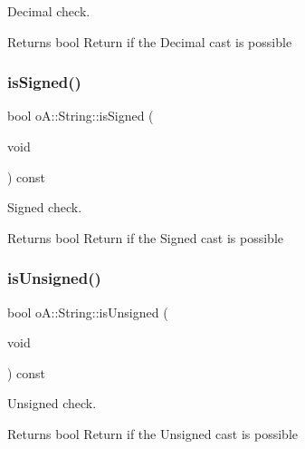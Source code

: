 Decimal check. 

\begin{DoxyReturn}{Returns}
bool Return if the Decimal cast is possible 
\end{DoxyReturn}
\mbox{\label{classo_a_1_1_string_ac88615009b2cdba26d1bf42187a66eb7}} 
\subsubsection{\texorpdfstring{is\+Signed()}{isSigned()}}
{\footnotesize\ttfamily bool o\+A\+::\+String\+::is\+Signed (\begin{DoxyParamCaption}\item[{void}]{ }\end{DoxyParamCaption}) const\hspace{0.3cm}{\ttfamily [noexcept]}}



Signed check. 

\begin{DoxyReturn}{Returns}
bool Return if the Signed cast is possible 
\end{DoxyReturn}
\mbox{\label{classo_a_1_1_string_aeb851821fb8dd5ca72d50413f72bb1a4}} 
\subsubsection{\texorpdfstring{is\+Unsigned()}{isUnsigned()}}
{\footnotesize\ttfamily bool o\+A\+::\+String\+::is\+Unsigned (\begin{DoxyParamCaption}\item[{void}]{ }\end{DoxyParamCaption}) const\hspace{0.3cm}{\ttfamily [noexcept]}}



Unsigned check. 

\begin{DoxyReturn}{Returns}
bool Return if the Unsigned cast is possible 
\end{DoxyReturn}
\mbox{\label{classo_a_1_1_string_abc7b54346e6c161fb0365336cda41957}} 
